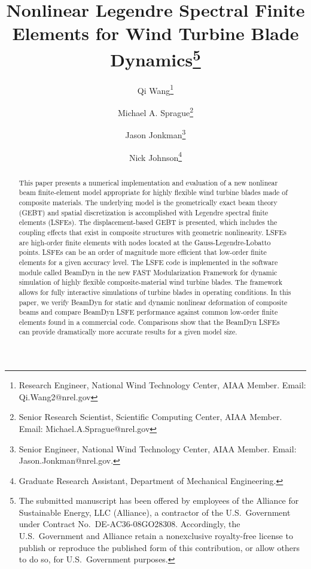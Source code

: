 \documentclass{aiaa-tc}
\title{Nonlinear Legendre Spectral Finite Elements for Wind Turbine Blade
Dynamics\thanks{The submitted manuscript has been offered by employees of
the
Alliance for Sustainable Energy, LLC (Alliance), a contractor of the U.S.\
Government under Contract No.\ DE-AC36-08GO28308.  Accordingly, the U.S.\
Government and Alliance retain a nonexclusive royalty-free license to
publish or reproduce the published form of this contribution, or allow
others to do so, for U.S.\ Government purposes.}}
\author[1]{Qi Wang\thanks{Research Engineer, National Wind Technology Center, AIAA Member. Email: Qi.Wang2@nrel.gov}}
\author[1]{Michael A. Sprague\thanks{Senior Research Scientist, Scientific
Computing Center, AIAA Member. Email: Michael.A.Sprague@nrel.gov}}
\author[1]{Jason Jonkman\thanks{Senior Engineer, National Wind Technology
Center, AIAA Member. Email: Jason.Jonkman@nrel.gov.}}
\author[2]{Nick Johnson\thanks{Graduate Research Assistant, Department of
Mechanical Engineering.}}
\affil[1]{National Renewable Energy Laboratory, Golden, CO 80401}
\affil[2]{Colorado School of Mines, Golden, CO 80401}
\renewcommand{\kill}[1]{\textcolor{red}{\sout{#1}}}
\begin{document}
\maketitle

\begin{abstract}
This paper presents a numerical implementation and evaluation of a new
nonlinear beam finite-element model appropriate for highly flexible
wind turbine blades made of composite materials.  The underlying model is
the geometrically exact beam theory (GEBT) and spatial discretization is
accomplished with Legendre spectral finite elements (LSFEs).  The
displacement-based GEBT is presented, which includes the coupling effects
that exist in composite structures with geometric nonlinearity.   LSFEs are
high-order finite elements with nodes located at the Gauss-Legendre-Lobatto
points.  LSFEs can be an order of magnitude more efficient that low-order
finite elements for a given accuracy level.    The LSFE code is implemented
in the software module called BeamDyn in the new FAST Modularization
Framework for dynamic simulation of highly flexible composite-material wind
turbine blades.  The framework allows for fully interactive simulations of
turbine blades in operating conditions.    In this paper, we verify BeamDyn
for static and dynamic nonlinear deformation of composite beams and compare
BeamDyn LSFE performance against common low-order finite elements found in a
commercial code.    Comparisons show that the BeamDyn LSFEs can provide
dramatically more accurate results for a given model size.
\end{abstract}


\end{document}
